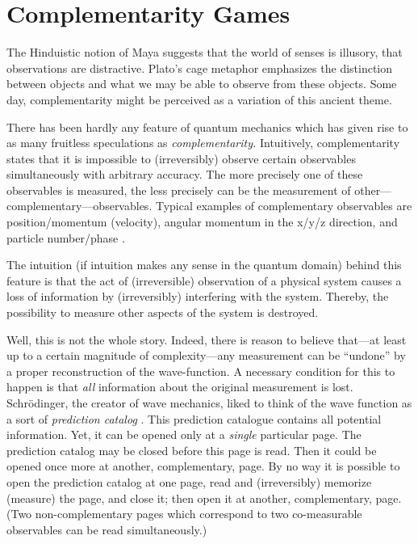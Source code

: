 


\section{Complementarity Games}

The Hinduistic notion of Maya suggests
that
the world of senses is illusory, that
observations are distractive.
Plato's cage metaphor emphasizes the
distinction between
objects and
what we may be able to observe from these objects.
Some day, complementarity might be perceived as a variation of this
ancient theme.



There has been hardly any feature of quantum mechanics which has given
rise to as many fruitless speculations
as
{\em complementarity.} Intuitively, complementarity states that it is
impossible to (irreversibly) observe certain observables simultaneously
with arbitrary accuracy. The more precisely one of these
observables is measured, the less precisely can be the measurement of
other---complementary---observables. Typical examples of complementary
observables are position/momentum (velocity), angular momentum in
the x/y/z direction, and particle number/phase
\cite{peres,wheeler-Zurek:83}.

The intuition (if intuition makes any sense in the quantum domain)
behind this feature is that the act of
(irreversible) observation
of a physical system causes a loss of information by (irreversibly)
interfering with the system. Thereby, the possibility to measure other
aspects of the system is destroyed.

Well, this is not the whole story.
Indeed, there is reason to
believe that---at least up to
a certain magnitude of complexity---any measurement can be ``undone'' by
a proper reconstruction of the wave-function. A necessary condition for
this to happen is that {\em all} information about the original
measurement is lost.
Schr\"odinger, the creator of wave mechanics, liked to think of the wave
function as a sort of
{\em prediction catalog} \cite{schroedinger}. This prediction catalogue
contains
all potential information. Yet, it can be opened only at a {\em single}
particular page.
The prediction catalog may be closed
before this page is read. Then it could be opened once more
at another, complementary, page.
By no way it is possible to open
the prediction catalog at one page, read and (irreversibly) memorize
(measure) the page, and close it; then open it at another,
complementary, page.
(Two non-complementary pages which correspond to two co-measurable
observables can be read simultaneously.)


